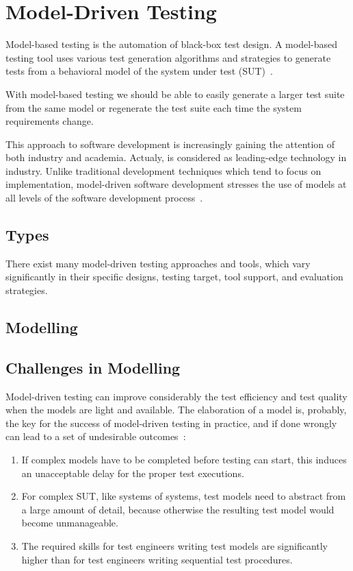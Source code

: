 \section{Model-Driven Testing}

Model-based testing is the automation of black-box test design. 
A model-based testing tool uses various test generation 
algorithms and strategies to generate tests from a 
behavioral model of the system under test (SUT)~\cite{1200168}.

With model-based testing we should be able to easily generate 
a larger test suite from the same model or regenerate the test
suite each time the system requirements change.

This approach to software
development is increasingly gaining the attention of
both industry and academia. Actualy, is considered as 
leading-edge technology in industry. Unlike traditional
development techniques which tend to focus on
implementation, model-driven software development
stresses the use of models at all levels of the software
development process~\cite{5381477}.

\subsection{Types}
There exist many model-driven testing approaches
and tools, which vary significantly in their specific designs,
testing target, tool support, and evaluation strategies.
 
\subsection{Modelling}
\subsection{Challenges in Modelling}
Model-driven testing can improve considerably the test 
efficiency and test quality when the models are light 
and available. The elaboration of a model is, probably, 
the key for the success of model-driven testing in practice,
and if done wrongly can lead to a set of undesirable 
outcomes~\cite{Peleska.2013}:

\begin{enumerate}
\item If complex models have to be completed before testing
can start, this induces an unacceptable delay for the
proper test executions.
\item For complex SUT, like systems of systems, test models 
need to abstract from a large amount of detail, because 
otherwise the resulting test model would become unmanageable.
\item The required skills for test engineers writing test 
models are significantly higher than for test engineers 
writing sequential test procedures.
\end{enumerate}

